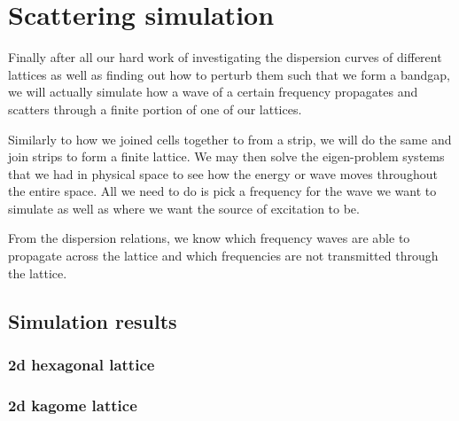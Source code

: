 \chapter{Scattering simulation}
\label{scattering}
Finally after all our hard work of investigating the dispersion curves of
different lattices as well as finding out how to perturb them such that we form
a bandgap, we will actually simulate how a wave of a certain frequency
propagates and scatters through a finite portion of one of our lattices.

Similarly to how we joined cells together to from a strip, we will do the same
and join strips to form a finite lattice. We may then solve the eigen-problem
systems that we had in physical space to see how the energy or wave moves
throughout the entire space. All we need to do is pick a frequency for the wave
we want to simulate as well as where we want the source of excitation to be.

From the dispersion relations, we know which frequency waves are able to
propagate across the lattice and which frequencies are not transmitted through
the lattice.

\section{Simulation results}

\subsection{2d hexagonal lattice}

\subsection{2d kagome lattice}
